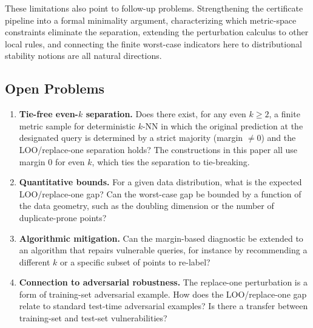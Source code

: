 These limitations also point to follow-up problems. Strengthening the
certificate pipeline into a formal minimality argument, characterizing which
metric-space constraints eliminate the separation, extending the perturbation
calculus to other local rules, and connecting the finite worst-case indicators
here to distributional stability notions are all natural directions.

\subsection{Open Problems}

\begin{enumerate}[leftmargin=*,label=(\arabic*)]

    \item \textbf{Tie-free even-$k$ separation.}
    Does there exist, for any even $k \ge 2$, a finite metric sample for
    deterministic $k$-NN in which the original prediction at the designated
    query is determined by a strict majority (margin $\neq 0$) and the
    LOO/replace-one separation holds? The constructions in this paper all use
    margin $0$ for even $k$, which ties the separation to tie-breaking.

    \item \textbf{Quantitative bounds.}
    For a given data distribution, what is the expected LOO/replace-one gap?
    Can the worst-case gap be bounded by a function of the data geometry,
    such as the doubling dimension or the number of duplicate-prone points?

    \item \textbf{Algorithmic mitigation.}
    Can the margin-based diagnostic be extended to an algorithm that repairs
    vulnerable queries, for instance by recommending a different $k$ or a
    specific subset of points to re-label?

    \item \textbf{Connection to adversarial robustness.}
    The replace-one perturbation is a form of training-set adversarial example.
    How does the LOO/replace-one gap relate to standard test-time adversarial
    examples? Is there a transfer between training-set and test-set
    vulnerabilities?

\end{enumerate}
